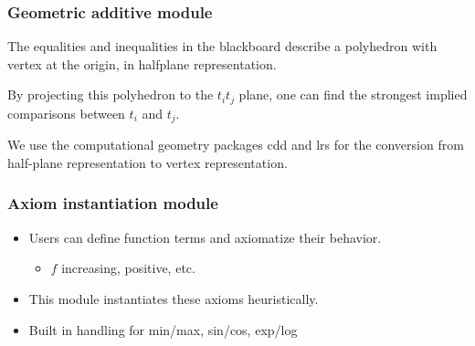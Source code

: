 \documentclass{beamer}
\begin{document}
\begin{frame}
 \frametitle{Geometric additive module}
The equalities and inequalities in the blackboard describe a polyhedron with vertex at the origin, in halfplane representation.  

 \vspace{.4cm}
 
 By projecting this polyhedron to the $t_i t_j$ plane, one can find the strongest implied comparisons between $t_i$ and $t_j$.
 
 \begin{figure}
\centering
\begin{subfigure}%
  \centering
  \resizebox{.25\linewidth}{.25\linewidth}{}
\end{subfigure}%
\hspace{.2\linewidth}
\begin{subfigure}%
  \centering
  \resizebox{.25\linewidth}{.25\linewidth}{}
  \label{fig:geo:projection:b}
\end{subfigure}
\label{fig:geo:projection}
\end{figure}

 We use the computational geometry packages \alert{cdd} and \alert{lrs} for the conversion from half-plane representation to vertex representation.
 
\end{frame}


\begin{frame}
\frametitle{Axiom instantiation module}
\begin{itemize}
\item Users can define function terms and axiomatize their behavior.
\begin{itemize}
\item $f$ increasing, positive, etc.
\end{itemize}
\item This module instantiates these axioms heuristically. 
\item Built in handling for min/max, sin/cos, exp/log
\end{itemize}
\end{frame}
\end{document}
